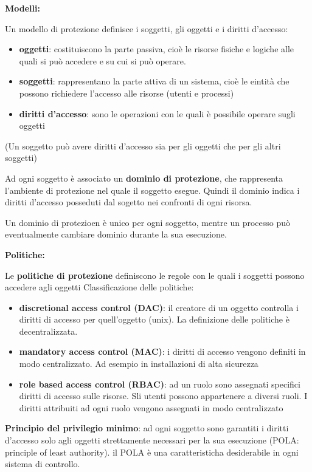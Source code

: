 \documentclass{article}
\begin{document}
\vspace{3mm}
\textbf{Modelli:}

Un modello di protezione definisce i soggetti, gli oggetti e i diritti d'accesso:
\begin{itemize}
    \item \textbf{oggetti}: costituiscono la parte passiva, cioè le risorse fisiche e logiche alle quali si può accedere e su cui si può operare.
    \item \textbf{soggetti}: rappresentano la parte attiva di un sistema, cioè le eintità che possono richiedere l'accesso alle risorse (utenti e processi)
    \item \textbf{diritti d'accesso}: sono le operazioni con le quali è possibile operare sugli oggetti
\end{itemize}

(Un soggetto può avere diritti d'accesso sia per gli oggetti che per gli altri soggetti)

Ad ogni soggetto è associato un \textbf{dominio di protezione}, che rappresenta l'ambiente di protezione nel quale il soggetto esegue. Quindi il dominio
indica i diritti d'accesso posseduti dal sogetto nei confronti di ogni risorsa.

Un dominio di protezioen è unico per ogni soggetto, mentre un processo può eventualmente cambiare dominio durante la sua esecuzione.

\vspace{3mm}
\textbf{Politiche:}

Le \textbf{politiche di protezione} definiscono le regole con le quali i soggetti possono accedere agli oggetti
Classificazione delle politiche:
\begin{itemize}
    \item \textbf{discretional access control (DAC)}: il creatore di un oggetto controlla i diritti di accesso per quell'oggetto (unix). La definizione delle politiche è
    decentralizzata.
    \item \textbf{mandatory access control (MAC)}: i diritti di accesso vengono definiti in modo centralizzato. Ad esempio in installazioni di alta sicurezza
    \item \textbf{role based access control (RBAC)}: ad un ruolo sono assegnati specifici diritti di accesso sulle risorse. Sli utenti possono appartenere a diversi
    ruoli. I diritti attribuiti ad ogni ruolo vengono assegnati in modo centralizzato
\end{itemize}

\vspace{3mm}
\textbf{Principio del privilegio minimo}: ad ogni soggetto sono garantiti i diritti d'accesso solo agli oggetti strettamente necessari per la sua esecuzione
(POLA: principle of least authority). il POLA è una caratteristicha desiderabile in ogni sistema di controllo.
\vspace{3mm}
\end{document}
